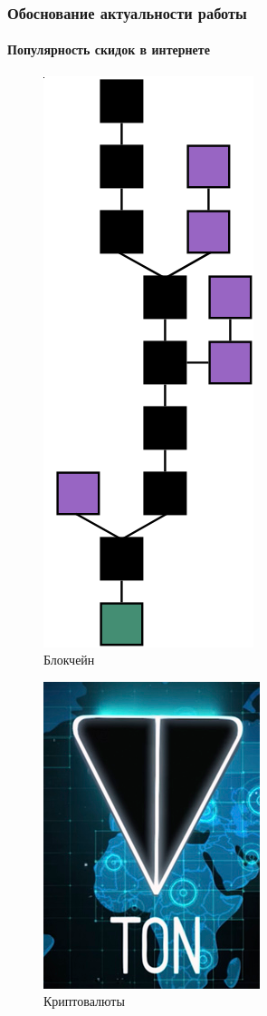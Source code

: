 \documentclass{beamer}
\begin{document}
\begin{frame}[c]
    \frametitle{Обоснование актуальности работы}
    \framesubtitle{Популярность скидок в интернете}

    \begin{multicols}{2}
    \begin{figure}
        \includegraphics[height=0.8\columnwidth]{blockchain.png}
        \captionsetup{labelformat=empty}
        \caption{Блокчейн}
    \end{figure}

        \columnbreak

        \begin{figure}
            \includegraphics[height=0.8\columnwidth]{ton.png}
            \captionsetup{labelformat=empty}
            \caption{Криптовалюты}
        \end{figure}
    \end{multicols}
\end{frame}
\end{document}
